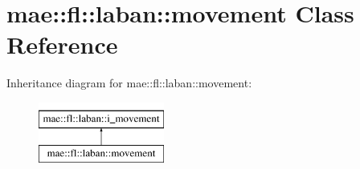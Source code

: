 \hypertarget{classmae_1_1fl_1_1laban_1_1movement}{\section{mae\-:\-:fl\-:\-:laban\-:\-:movement Class Reference}
\label{classmae_1_1fl_1_1laban_1_1movement}
}
Inheritance diagram for mae\-:\-:fl\-:\-:laban\-:\-:movement\-:\begin{figure}[H]
\begin{center}
\leavevmode
\includegraphics[height=2.000000cm]{classmae_1_1fl_1_1laban_1_1movement}
\end{center}
\end{figure}
